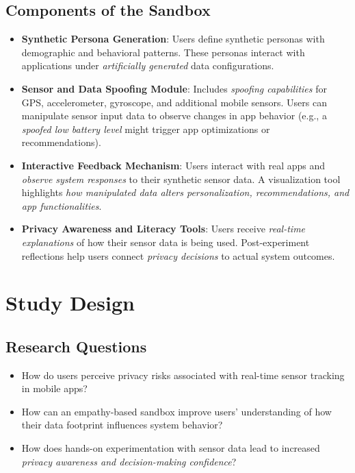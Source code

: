 \documentclass[acmlarge, nonacm]{acmart}
\begin{document}
\subsection{Components of the Sandbox}
\begin{itemize}
    \item \textbf{Synthetic Persona Generation}: Users define synthetic personas with demographic and behavioral patterns. These personas interact with applications under \textit{artificially generated} data configurations.
    \item \textbf{Sensor and Data Spoofing Module}: Includes \textit{spoofing capabilities} for GPS, accelerometer, gyroscope, and additional mobile sensors. Users can manipulate sensor input data to observe changes in app behavior (e.g., a \textit{spoofed low battery level} might trigger app optimizations or recommendations).
    \item \textbf{Interactive Feedback Mechanism}: Users interact with real apps and \textit{observe system responses} to their synthetic sensor data. A visualization tool highlights \textit{how manipulated data alters personalization, recommendations, and app functionalities}.
    \item \textbf{Privacy Awareness and Literacy Tools}: Users receive \textit{real-time explanations} of how their sensor data is being used. Post-experiment reflections help users connect \textit{privacy decisions} to actual system outcomes.
\end{itemize}

\section{Study Design}

\subsection{Research Questions}
\begin{itemize}
    \item How do users perceive privacy risks associated with real-time sensor tracking in mobile apps?
    \item How can an empathy-based sandbox improve users’ understanding of how their data footprint influences system behavior?
    \item How does hands-on experimentation with sensor data lead to increased \textit{privacy awareness and decision-making confidence}?
\end{itemize}
\end{document}
